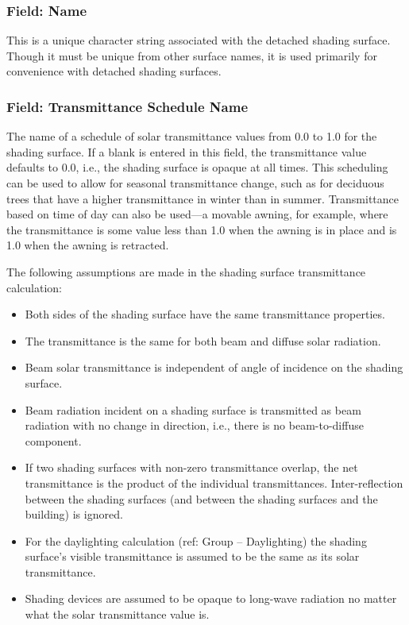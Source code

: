 \subsubsection{Field: Name}\label{field-name-23-004}

This is a unique character string associated with the detached shading surface. Though it must be unique from other surface names, it is used primarily for convenience with detached shading surfaces.

\subsubsection{Field: Transmittance Schedule Name}\label{field-transmittance-schedule-name}

The name of a schedule of solar transmittance values from 0.0 to 1.0 for the shading surface. If a blank is entered in this field, the transmittance value defaults to 0.0, i.e., the shading surface is opaque at all times. This scheduling can be used to allow for seasonal transmittance change, such as for deciduous trees that have a higher transmittance in winter than in summer. Transmittance based on time of day can also be used---a movable awning, for example, where the transmittance is some value less than 1.0 when the awning is in place and is 1.0 when the awning is retracted.

The following assumptions are made in the shading surface transmittance calculation:

\begin{itemize}
\item
  Both sides of the shading surface have the same transmittance properties.
\item
  The transmittance is the same for both beam and diffuse solar radiation.
\item
  Beam solar transmittance is independent of angle of incidence on the shading surface.
\item
  Beam radiation incident on a shading surface is transmitted as beam radiation with no change in direction, i.e., there is no beam-to-diffuse component.
\item
  If two shading surfaces with non-zero transmittance overlap, the net transmittance is the product of the individual transmittances. Inter-reflection between the shading surfaces (and between the shading surfaces and the building) is ignored.
\item
  For the daylighting calculation (ref: Group -- Daylighting) the shading surface's visible transmittance is assumed to be the same as its solar transmittance.
\item
  Shading devices are assumed to be opaque to long-wave radiation no matter what the solar transmittance value is.
\end{itemize}

